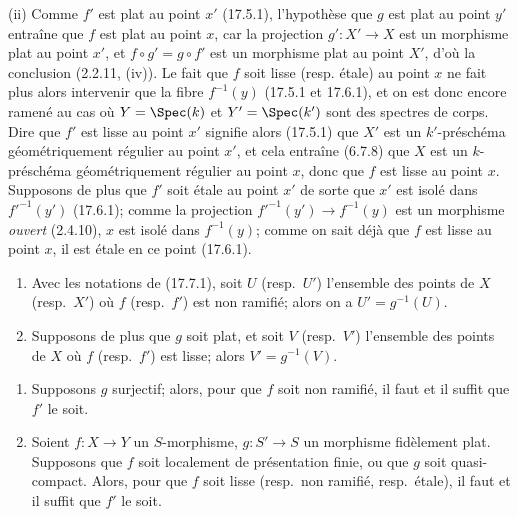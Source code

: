 (ii) Comme $f'$ est plat au point $x'$ (17.5.1), l'hypothèse que $g$ est plat au point $y'$ entraîne que $f$ est plat au point $x$, car la projection $g':X'\to X$ est un morphisme plat au point $x'$, et $f\circ g'=g\circ f'$ est un morphisme plat au point $X'$, d'où la conclusion (2.2.11, (iv)). Le fait que $f$ soit lisse (resp. étale) au point $x$ ne fait plus alors intervenir que la fibre $f^{-1}(y)$ (17.5.1 et 17.6.1), et on est donc encore ramené au cas où $Y=\Spec(k)$ et $Y'=\Spec(k')$ sont des spectres de corps. Dire que $f'$ est lisse au point $x'$ signifie alors (17.5.1) que $X'$ est un $k'$-préschéma géométriquement régulier au point $x'$, et cela entraîne (6.7.8) que $X$ est un $k$-préschéma géométriquement régulier au point $x$, donc que $f$ est lisse au point $x$. Supposons de plus que $f'$ soit étale au point $x'$ de sorte que $x'$ est isolé dans $f'^{-1}(y')$ (17.6.1); comme la projection $f'^{-1}(y')\to f^{-1}(y)$ est un morphisme \emph{ouvert} (2.4.10), $x$ est isolé dans $f^{-1}(y)$; comme on sait déjà que $f$ est lisse au point $x$, il est étale en ce point (17.6.1).

\begin{corollary}[17.7.2]
\label{IV.17.7.2}
\begin{enumerate}
  \item[\textup{(i)}] Avec les notations de \textup{(17.7.1)}, soit $U$ \textup{(resp.}\ $U'$\textup{)} l'ensemble des points de $X$ \textup{(resp.}\ $X'$\textup{)} où $f$ \textup{(resp.}\ $f'$\textup{)} est non ramifié; alors on a $U'=g^{-1}(U)$.
  \item[\textup{(ii)}] Supposons de plus que $g$ soit plat, et soit $V$ \textup{(resp.}\ $V'$\textup{)} l'ensemble des points de $X$ où $f$ \textup{(resp.}\ $f'$\textup{)} est lisse; alors $V'=g^{-1}(V)$.
\end{enumerate}
\end{corollary}

\begin{corollary}[17.7.3]
\label{IV.17.7.3}
\begin{enumerate}
  \item[\textup{(i)}] Supposons $g$ surjectif; alors, pour que $f$ soit non ramifié, il faut et il suffit que $f'$ le soit.
  \item[\textup{(ii)}] Soient $f:X\to Y$ un $S$-morphisme, $g:S'\to S$ un morphisme fidèlement plat. Supposons que $f$ soit localement de présentation finie, \textup{ou} que $g$ soit quasi-compact. Alors, pour que $f$ soit lisse \textup{(resp.}\ non ramifié, \textup{resp.}\ étale\textup{)}, il faut et il suffit que $f'$ le soit.
\end{enumerate}
\end{corollary}

